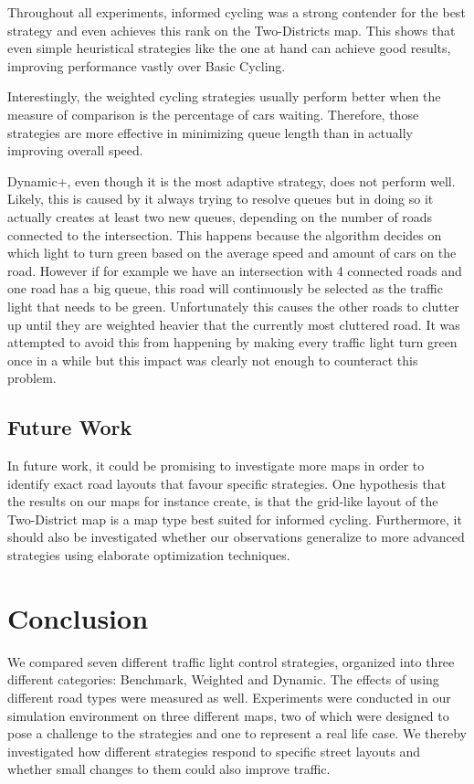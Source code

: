 \documentclass[11pt]{article}
\begin{document}
Throughout all experiments, informed cycling was a strong contender for the best strategy and even achieves this rank on the Two-Districts map. This shows that even simple heuristical strategies like the one at hand can achieve good results, improving performance vastly over Basic Cycling.

Interestingly, the weighted cycling strategies usually perform better when the measure of comparison is the percentage of cars waiting. Therefore, those strategies are more effective in minimizing queue length than in actually improving overall speed.

Dynamic+, even though it is the most adaptive strategy, does not perform well. Likely, this is caused by it always trying to resolve queues but in doing so it actually creates at least two new queues, depending on the number of roads connected to the intersection. This happens because the algorithm decides on which light to turn green based on the average speed and amount of cars on the road. However if for example we have an intersection with 4 connected roads and one road has a big queue, this road will continuously be selected as the traffic light that needs to be green. Unfortunately this causes the other roads to clutter up until they are weighted heavier that the currently most cluttered road. It was attempted to avoid this from happening by making every traffic light turn green once in a while but this impact was clearly not enough to counteract this problem.

\subsection{Future Work}
In future work, it could be promising to investigate more maps in order to identify exact road layouts that favour specific strategies. One hypothesis that the results on our maps for instance create, is that the grid-like layout of the Two-District map is a map type best suited for informed cycling. Furthermore, it should also be investigated whether our observations generalize to more advanced strategies using elaborate optimization techniques.

\section{Conclusion}
\label{sec:conclusion}
We compared seven different traffic light control strategies, organized into three different categories: Benchmark, Weighted and Dynamic. The effects of using different road types were measured as well. Experiments were conducted in our simulation environment on three different maps, two of which were designed to pose a challenge to the strategies and one to represent a real life case. We thereby investigated how different strategies respond to specific street layouts and whether small changes to them could also improve traffic.
\end{document}

